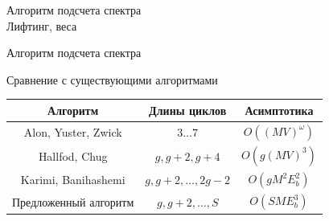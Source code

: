 \documentclass[t,13pt,graphics=pdflatex,xcolor=table,aspectratio=43]{beamer}
\begin{document}
\begin{frame}{Алгоритм подсчета спектра \\ Лифтинг, веса}
    \begin{minipage}{0.2\textwidth}
        \centering
        
    \end{minipage}\hfill
    \begin{minipage}{0.75\textwidth}
        \centering
        
    \end{minipage}
    \vfill
\end{frame}

\begin{frame}{Алгоритм подсчета спектра}

\begin{center}
\scalebox{0.65}{
\begin{minipage}{\linewidth}
	\begin{algorithm}[H]
	\begin{algorithmic}
	\Function{CountCycles}{$A$, $L_{MAX}$}
		\State $E \gets size(A,1)$
		\For{$L \gets [1; \lfloor\frac{L_{MAX}}{2}\rfloor$]}
			\For{$i \gets [0; E)$}
				\State $a_0^i \gets (\underbrace{0,0,...,0}_{i \text{ раз}},1,0,...,0)$
				\State $a_{2L}^i \gets a_0^i \cdot A^L$
				\State $b_{2L} \mathrel{+}= a_{2L}^i$
			\EndFor
			\State $g_{2L} \gets 0$
			\For{$d \gets [1; 2L]$, $d|2L$}
				\State $g_{2L} \mathrel{+}= \mu(d) \cdot T_d(b_{2L/d})$
			\EndFor
			\State $g_{2L} /= 2L$
			\For{$d \gets [1; 2L]$, $d|2L$}
				\For{$w \gets [0; M)$, $\frac{w \cdot 2L}{d}=0\pmod{M}$}
					\State $C_{2L} \mathrel{+}= g^{(w)}_d(0)$
				\EndFor
			\EndFor
		\EndFor
		\State\Return C
	\EndFunction	
\end{algorithmic}
\end{algorithm}
\end{minipage}
}
\end{center}

\end{frame}

\begin{frame}{Сравнение с существующими алгоритмами}
	\begin{center}
	\begin{tabular}{|c|c|c|}
	\hline
	Алгоритм & Длины циклов & Асимптотика\\
	\hline
	Alon, Yuster, Zwick &  $3 \ldots 7$ & $O((MV)^{\omega})$ \\
	\hline
	Hallfod, Chug &  $g, g+2, g+4$ & $O(g(MV)^3)$\\
	\hline
	Karimi, Banihashemi & $g, g+2, \ldots, 2g-2$ & $O(gM^2E_b^2)$ \\
	\hline
	Предложенный алгоритм & $g, g+2, \ldots, S$ & $O(SME_b^3)$ \\
	\hline
\end{tabular}
\end{center}

\end{frame}
\end{document}
